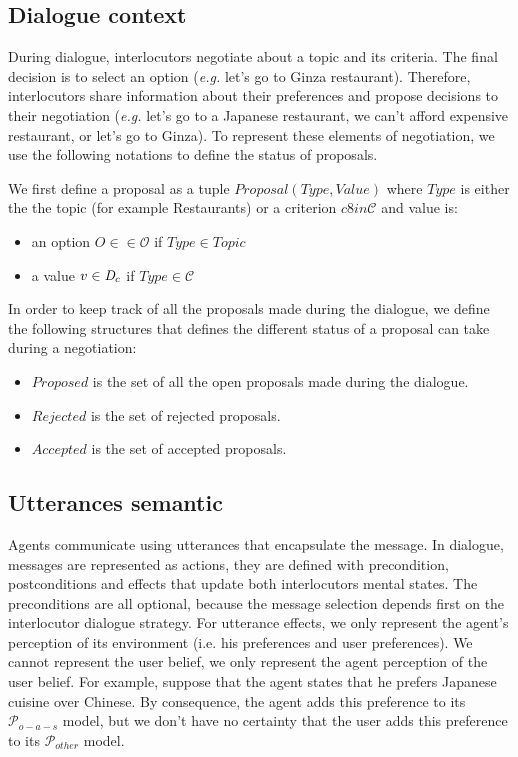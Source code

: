 \documentclass{llncs}
\begin{document}
 
\subsection{Dialogue context}
 
During dialogue, interlocutors  negotiate  about a topic and its criteria. The final decision is to select an option (\emph{e.g.} let's go to Ginza restaurant). Therefore, interlocutors share information about their preferences and propose decisions to their negotiation (\emph{e.g.} let's go to a Japanese restaurant, we can't afford expensive restaurant, or let's go to Ginza). To represent these elements of negotiation, we use the following notations to define the status of proposals.

We first define a proposal as a tuple $Proposal(Type, Value)$ where  $Type$ is either the the topic (for example Restaurants) or a criterion $c 8in \mathcal{C}$ and value is:
\begin{itemize}
	\item an option $O \in \in \mathcal{O}$ if $Type \in Topic$ 
	\item a value $v \in \emph{D}_c$ if $Type \in \mathcal{C}$
\end{itemize}
    

In order to keep track of all the proposals made during the dialogue, we define the following structures that defines the different status of a proposal can take during a negotiation:
 \begin{itemize}
	 	\item $Proposed$ is the set of all the open proposals made during the dialogue.
	 	\item $Rejected$  is the set of rejected proposals.
	 	\item $Accepted$  is the set of accepted proposals.
 \end{itemize}


\subsection{Utterances semantic}
Agents communicate using utterances that encapsulate the message. In dialogue, messages are represented as actions, they are defined with precondition, postconditions and effects that update both interlocutors mental states. The preconditions are all optional, because the message selection depends first on the interlocutor dialogue strategy. For utterance effects, we only represent the  agent's perception of its environment (i.e. his preferences and user preferences). We cannot represent the user belief, we only represent the agent perception of the user belief. For example, suppose that the agent states that he prefers Japanese cuisine over Chinese. By consequence, the agent adds this preference to its $\mathcal{P}_{o-a-s}$ model, but we don't have no certainty that the user adds this preference to its $\mathcal{P}_{other}$  model.
\end{document}
